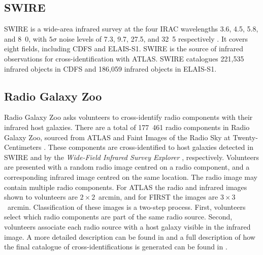 \documentclass[fleqn,usenatbib,usedcolumn]{mnras}
\newcommand{\jansky}{\text{Jy}}
\begin{document}


  \subsection{SWIRE}\label{sec:swire}

    SWIRE \citep{lonsdale03swire, surace05swire} is a wide-area infrared
    survey at the four IRAC wavelengths 3.6, 4.5, 5.8, and
    \unit{8.0}{\micro\meter}, with $5\sigma$ noise levels of 7.3,
    9.7, 27.5, and \unit{32.5}{\micro\jansky} respectively
    \citep{lonsdale03swire}. It covers eight fields, including CDFS and ELAIS-S1. SWIRE is the source of infrared
    observations for cross-identification with ATLAS. SWIRE catalogues 221,535
    infrared objects in CDFS and 186,059 infrared objects in ELAIS-S1.

  \subsection{Radio Galaxy Zoo}\label{sec:rgz}
    
    Radio Galaxy Zoo asks volunteers to cross-identify radio components with
    their infrared host galaxies. There are a total of 177~461 radio
    components in Radio Galaxy Zoo, sourced from ATLAS and Faint Images of the
    Radio Sky at Twenty-Centimeters \citep[FIRST;][]{white97first}. These
    components are cross-identified to host galaxies detected in SWIRE and by
    the \emph{Wide-Field Infrared Survey Explorer}
    \citep[WISE;][]{wright10wise}, respectively. Volunteers are presented with
    a random radio image centred on a radio component, and a corresponding
    infrared image centred on the same location. The radio image may contain
    multiple radio components. For ATLAS the radio and infrared images shown
    to volunteers are $2 \times 2$~arcmin, and for FIRST the images are $3
    \times 3$~arcmin. Classification of these images is a two-step process.
    First, volunteers select which radio components are part of the same radio
    source. Second, volunteers associate each radio source with a host galaxy
    visible in the infrared image. A more detailed description can be found in
    \citet{banfield15} and a full description of how the final catalogue of
    cross-identifications is generated can be found in \citet{wong17}.
\end{document}
